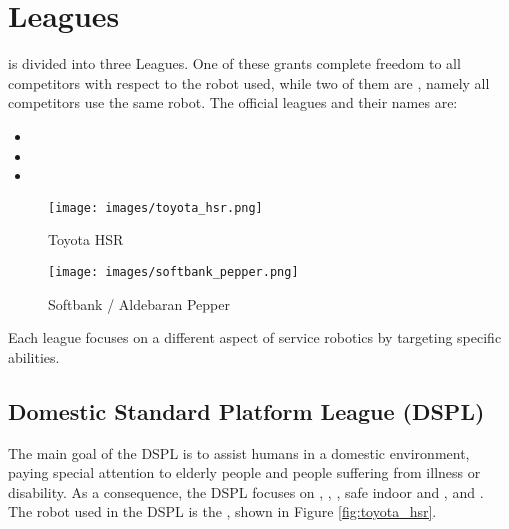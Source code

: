 \section{Leagues}
\label{sec:leagues}

\AtHome{} is divided into three Leagues. One of these grants complete freedom to all competitors with respect to the robot used, while two of them are \SPLs{}, namely all competitors use the same robot. The official leagues and their names are:
\begin{itemize}
  \item \OPL
  \item \DSPL
  \item \SSPL
\end{itemize}

\begin{wrapfigure}[21]{r}{0.30\textwidth}
	\vspace{-30pt}
	\begin{center}
		\texttt{[image: images/toyota\_hsr.png]}
		\vspace{-10pt}
		\caption{Toyota HSR}
		\label{fig:toyota_hsr}
	\end{center}

	\vspace{-20pt}
	\begin{center}
		\texttt{[image: images/softbank\_pepper.png]}
		\vspace{-10pt}
		\caption{Softbank / Aldebaran Pepper}
		\label{fig:softbank_pepper}
	\end{center}
\end{wrapfigure}
Each league focuses on a different aspect of service robotics by targeting specific abilities.

\subsection{Domestic Standard Platform League (DSPL)}

The main goal of the DSPL is to assist humans in a domestic environment, paying special attention to elderly people and people suffering from illness or disability.
As a consequence, the DSPL focuses on \AmI, \CV, \OM, safe indoor \NAV{} and \MAP, and \TP.
The robot used in the DSPL is the \HSR, shown in Figure \ref{fig:toyota_hsr}.

